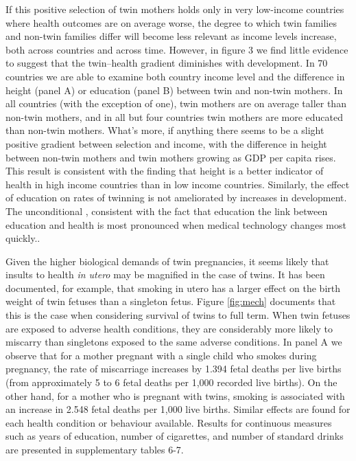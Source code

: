 \documentclass{nature}
\begin{document}
\begin{linenumbers}
If this positive selection of twin mothers holds only in very low-income countries where health outcomes are on average worse, the degree to which twin families and non-twin families differ will become less relevant as income levels increase, both across countries and across time.  However, in figure 3 we find little evidence to suggest that the twin--health gradient diminishes with development.  In 70 countries we are able to examine both country income level and the difference in height (panel A) or education (panel B) between twin and non-twin mothers.  In all countries (with the exception of one), twin mothers are on average taller than non-twin mothers, and in all but four countries twin mothers are more educated than non-twin mothers.  What's more, if anything there seems to be a slight positive gradient between selection and income, with the difference in height between non-twin mothers and twin mothers growing as GDP per capita rises.  This result is consistent with the finding that height is a better indicator of health in high income countries than in low income countries\cite{Deaton2007}.  Similarly, the effect of education on rates of twinning is not ameliorated by increases in development.  The unconditional , consistent with the fact that education the link between education and health is most pronounced when medical technology changes most quickly.\cite{LlerasMuneyGlied2008}.

Given the higher biological demands of twin pregnancies\cite{Shinagawaetal2005,Kahnetal2003}, it seems likely that insults to health \emph{in utero} may be magnified in the case of twins.  It has been documented, for example, that smoking in utero has a larger effect on the birth weight of twin fetuses than a singleton fetus\cite{Pollacketal2000}.  Figure \ref{fig:mech} documents that this is the case when considering survival of twins to full term.  When twin fetuses are exposed to adverse health conditions, they are considerably more likely to miscarry than singletons exposed to the same adverse conditions.  In panel A we observe that for a mother pregnant with a single child who smokes during pregnancy, the rate of miscarriage increases by 1.394 fetal deaths per live births (from approximately 5 to 6 fetal deaths per 1,000 recorded live births).  On the other hand, for a mother who is pregnant with twins, smoking is associated with an increase in 2.548 fetal deaths per 1,000 live births.  Similar effects are found for each health condition or behaviour available.  Results for continuous measures such as years of education, number of cigarettes, and number of standard drinks are presented in supplementary tables 6-7.  


\end{linenumbers}
\end{document}
